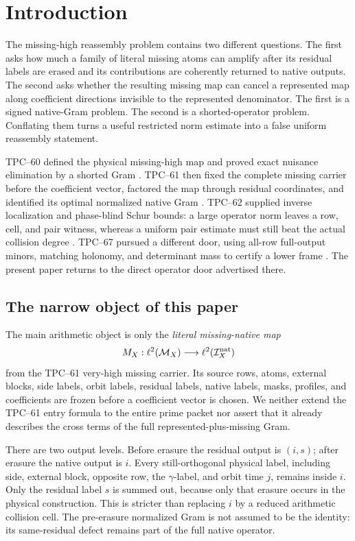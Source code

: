 \section{Introduction}
\label{sec:tpc68-introduction}

The missing-high reassembly problem contains two different questions.  The
first asks how much a family of literal missing atoms can amplify after its
residual labels are erased and its contributions are coherently returned to
native outputs.  The second asks whether the resulting missing map can
cancel a represented map along coefficient directions invisible to the
represented denominator.  The first is a signed native-Gram problem.  The
second is a shorted-operator problem.  Conflating them turns a useful
restricted norm estimate into a false uniform reassembly statement.

TPC--60 defined the physical missing-high map and proved exact nuisance
elimination by a shorted Gram \citep{WangTPC60}.  TPC--61 then fixed the
complete missing carrier before the coefficient vector, factored the map
through residual coordinates, and identified its optimal normalized native
Gram \citep{WangTPC61}.  TPC--62 supplied inverse localization and
phase-blind Schur bounds: a large operator norm leaves a row, cell, and pair
witness, whereas a uniform pair estimate must still beat the actual
collision degree \citep{WangTPC62}.  TPC--67 pursued a different door,
using all-row full-output minors, matching holonomy, and determinant mass
to certify a lower frame \citep{WangTPC67}.  The present paper returns to
the direct operator door advertised there.

\subsection{The narrow object of this paper}

The main arithmetic object is only the \emph{literal missing-native map}
\[
 M_X:\ell^2(\mathcal M_X)\longrightarrow\ell^2(\mathcal I_X^{\rm nat})
\]
from the TPC--61 very-high missing carrier.  Its source rows, atoms,
external blocks, side labels, orbit labels, residual labels, native labels,
masks, profiles, and coefficients are frozen before a coefficient vector is
chosen.  We neither extend the TPC--61 entry formula to the entire prime
packet nor assert that it already describes the cross terms of the full
represented-plus-missing Gram.

There are two output levels.  Before erasure the residual output is
\((i,s)\); after erasure the native output is \(i\).  Every still-orthogonal
physical label, including side, external block, opposite row, the
\(\gamma\)-label, and orbit time \(j\), remains inside \(i\).  Only the
residual label \(s\) is summed out, because only that erasure occurs in the
physical construction.  This is stricter than replacing \(i\) by a
reduced arithmetic collision cell.  The pre-erasure normalized Gram is
not assumed to be the identity: its same-residual defect remains part of
the full native operator.

